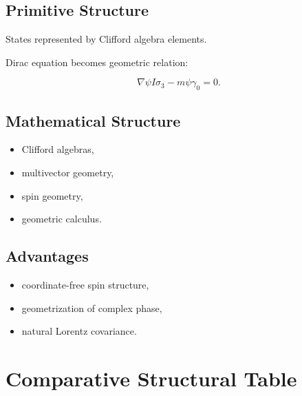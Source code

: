 \documentclass[11pt]{article}
\begin{document}
\subsection{Primitive Structure}

States represented by Clifford algebra elements.

Dirac equation becomes geometric relation:

\[
\nabla \psi I\sigma_3
-
m\psi\gamma_0
=
0.
\]

\subsection{Mathematical Structure}

\begin{itemize}
\item Clifford algebras,
\item multivector geometry,
\item spin geometry,
\item geometric calculus.
\end{itemize}

\subsection{Advantages}

\begin{itemize}
\item coordinate-free spin structure,
\item geometrization of complex phase,
\item natural Lorentz covariance.
\end{itemize}

\section{Comparative Structural Table}
\end{document}
